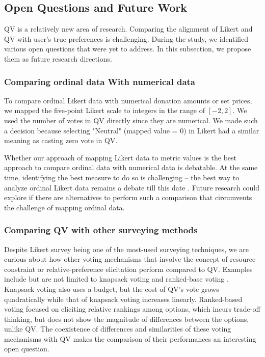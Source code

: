 \subsection{Open Questions and Future Work}
QV is a relatively new area of research. Comparing the alignment of Likert and QV with user's true preferences is challenging. During the study, we identified various open questions that were yet to address. In this subsection, we propose them as future research directions.

\subsubsection{Comparing ordinal data With numerical data}
To compare ordinal Likert data with numerical donation amounts or set prices, we mapped the five-point Likert scale to integers in the range of $[-2, 2]$. We used the number of votes in QV directly since they are numerical. We made such a decision because selecting "Neutral" (mapped value = 0) in Likert had a similar meaning as casting zero vote in QV.

Whether our approach of mapping Likert data to metric values is the best approach to compare ordinal data with numerical data is debatable. At the same time, identifying the best measure to do so is challenging -- the best way to analyze ordinal Likert data remains a debate till this date \cite{gob2007ordinal}. Future research could explore if there are alternatives to perform such a comparison that circumvents the challenge of mapping ordinal data. 

\subsubsection{Comparing QV with other surveying methods}
Despite Likert survey being one of the most-used surveying techniques, we are curious about how other voting mechanisms that involve the concept of resource constraint or relative-preference elicitation perform compared to QV. Examples include but are not limited to knapsack voting \cite{goel2015knapsack} and ranked-base voting \cite{ledo2018evaluation}. Knapsack voting also uses a budget, but the cost of QV's vote grows quadratically while that of knapsack voting increases linearly. Ranked-based voting focused on eliciting relative rankings among options, which incurs trade-off thinking, but does not show the magnitude of differences between the options, unlike QV. The coexistence of differences and similarities of these voting mechanisms with QV makes the comparison of their performances an interesting open question.

